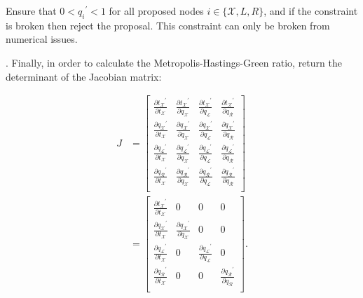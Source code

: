 \documentclass[12pt]{article}
\begin{document}
Ensure that $0 < {q_i}^\prime < 1$ for all proposed nodes $i \in \{\mathcal{X}, L, R\}$, and if the constraint is broken then reject the proposal. 
This constraint can only be broken from numerical issues.





. Finally, in order to calculate the Metropolis-Hastings-Green ratio, return the determinant of the Jacobian matrix:






\begin{align}
	J &= \begin{bmatrix} \frac{\partial {t_\mathcal{X}}^\prime}{\partial t_\mathcal{X}} & \frac{\partial {t_\mathcal{X}}^\prime}{\partial q_\mathcal{X}} & \frac{\partial {t_\mathcal{X}}^\prime}{\partial q_\mathcal{L}} & \frac{\partial {t_\mathcal{X}}^\prime}{\partial q_\mathcal{R}} \\
			\frac{\partial {q_\mathcal{X}}^\prime}{\partial t_\mathcal{X}} & \frac{\partial {q_\mathcal{X}}^\prime}{\partial q_\mathcal{X}} & \frac{\partial {q_\mathcal{X}}^\prime}{\partial q_\mathcal{L}} & \frac{\partial {q_\mathcal{X}}^\prime}{\partial q_\mathcal{R}} \\
			\frac{\partial {q_\mathcal{L}}^\prime}{\partial t_\mathcal{X}} & \frac{\partial {q_\mathcal{L}}^\prime}{\partial q_\mathcal{X}} & \frac{\partial {q_\mathcal{L}}^\prime}{\partial q_\mathcal{L}} & \frac{\partial {q_\mathcal{L}}^\prime}{\partial q_\mathcal{R}} \\
			\frac{\partial {q_\mathcal{R}}^\prime}{\partial t_\mathcal{X}} & \frac{\partial {q_\mathcal{R}}^\prime}{\partial q_\mathcal{X}} & \frac{\partial {q_\mathcal{R}}^\prime}{\partial q_\mathcal{L}} & \frac{\partial {q_\mathcal{R}}^\prime}{\partial q_\mathcal{R}} \\ \end{bmatrix} \nonumber \\
			&= \begin{bmatrix} \frac{\partial {t_\mathcal{X}}^\prime}{\partial t_\mathcal{X}} & 0 & 0 & 0 \\
			\frac{\partial {q_\mathcal{X}}^\prime}{\partial t_\mathcal{X}} & \frac{\partial {q_\mathcal{X}}^\prime}{\partial q_\mathcal{X}} & 0 & 0 \\
			\frac{\partial {q_\mathcal{L}}^\prime}{\partial t_\mathcal{X}} & 0 & \frac{\partial {q_\mathcal{L}}^\prime}{\partial q_\mathcal{L}} & 0 \\
			\frac{\partial {q_\mathcal{R}}^\prime}{\partial t_\mathcal{X}} & 0 & 0 & \frac{\partial {q_\mathcal{R}}^\prime}{\partial q_\mathcal{R}} \\ \end{bmatrix}.
\end{align}
\end{document}
